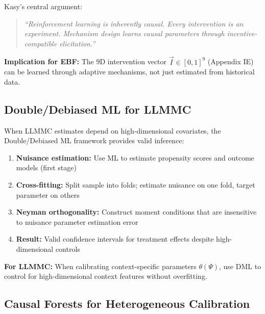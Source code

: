 \begin{tcolorbox}[colback=yellow!5!white, colframe=yellow!75!black,
    title=Key Insight: Causality $\Leftrightarrow$ Decision]

Kasy's central argument:
\begin{quote}
\emph{``Reinforcement learning is inherently causal. Every intervention is an experiment.
Mechanism design learns causal parameters through incentive-compatible elicitation.''}
\end{quote}

\textbf{Implication for EBF:} The 9D intervention vector $\vec{I} \in [0,1]^9$
(Appendix IE) can be learned through adaptive mechanisms, not just estimated from
historical data.
\end{tcolorbox}

\subsection{Double/Debiased ML for LLMMC}

When LLMMC estimates depend on high-dimensional covariates, the Double/Debiased ML
framework \citep{PAP-chernozhukov2018double} provides valid inference:

\begin{enumerate}
\item \textbf{Nuisance estimation:} Use ML to estimate propensity scores and
outcome models (first stage)

\item \textbf{Cross-fitting:} Split sample into folds; estimate nuisance on
one fold, target parameter on others

\item \textbf{Neyman orthogonality:} Construct moment conditions that are
insensitive to nuisance parameter estimation error

\item \textbf{Result:} Valid confidence intervals for treatment effects despite
high-dimensional controls
\end{enumerate}

\textbf{For LLMMC:} When calibrating context-specific parameters $\theta(\Psi)$,
use DML to control for high-dimensional context features without overfitting.

\subsection{Causal Forests for Heterogeneous Calibration}


